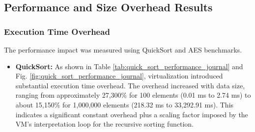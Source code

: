 \subsection{Performance and Size Overhead Results}

\subsubsection{Execution Time Overhead}
The performance impact was measured using QuickSort and AES benchmarks.

\begin{itemize}
	\item \textbf{QuickSort:} As shown in Table \ref{tab:quick_sort_performance_journal} and Fig. \ref{fig:quick_sort_performance_journal}, virtualization introduced substantial execution time overhead. The overhead increased with data size, ranging from approximately 27,300\% for 100 elements (0.01 ms to 2.74 ms) to about 15,150\% for 1,000,000 elements (218.32 ms to 33,292.91 ms). This indicates a significant constant overhead plus a scaling factor imposed by the VM's interpretation loop for the recursive sorting function.
	      \begin{table}[!t]
		      \centering
		      \caption{Quick Sort Execution Time Results (ms)}
		      \label{tab:quick_sort_performance_journal}
\end{table}
\end{itemize}
